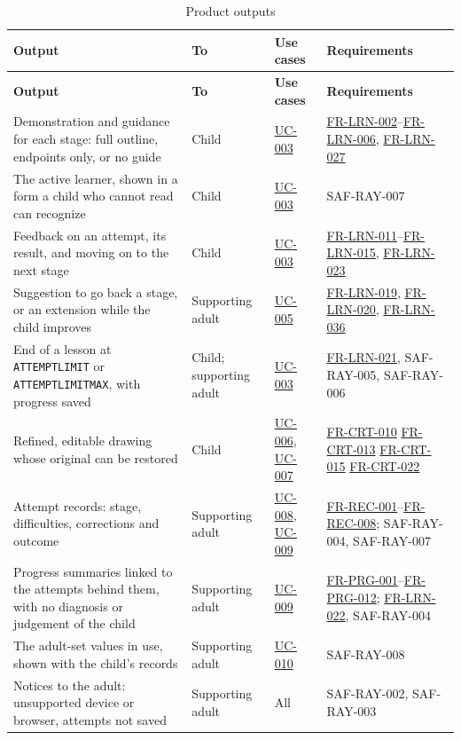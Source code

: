 \documentclass[12pt]{article}
\renewcommand{\_}{\textunderscore\allowbreak}%
\newcommand{\ucref}[1]{\hyperref[uc:#1]{\mbox{UC-#1}}}
\newcommand{\reqref}[1]{\hyperref[req:#1]{#1}}
\providecommand{\ucref}[1]{\hyperref[uc:#1]{UC-#1}}
\begin{document}
{\footnotesize
\setlength{\tabcolsep}{4pt}
\begin{longtable}{@{}
  >{\raggedright\arraybackslash}p{}
  >{\raggedright\arraybackslash}p{}
  >{\raggedright\arraybackslash}p{}
  >{\raggedright\arraybackslash}p{}@{}} \caption{Product
  outputs}\label{tab:product-outputs}\\
\toprule
\textbf{Output} & \textbf{To} & \textbf{Use cases} & \textbf{Requirements} \\
\midrule
\endfirsthead
\toprule
\textbf{Output} & \textbf{To} & \textbf{Use cases} & \textbf{Requirements} \\
\midrule
\endhead
\bottomrule
\endlastfoot
Demonstration and guidance for each stage: full outline, endpoints only, or no
guide & Child & \ucref{003} &
\mbox{\reqref{FR-LRN-002}}--\mbox{\reqref{FR-LRN-006}}, \mbox{\reqref{FR-LRN-027}} \\
\addlinespace
The active learner, shown in a form a child who cannot read can recognize &
Child & \ucref{003} & SAF-RAY-007 \\
\addlinespace
Feedback on an attempt, its result, and moving on to the next stage & Child &
\ucref{003} & \mbox{\reqref{FR-LRN-011}}--\mbox{\reqref{FR-LRN-015}},
\mbox{\reqref{FR-LRN-023}} \\
\addlinespace
Suggestion to go back a stage, or an extension while the child improves &
Supporting adult & \ucref{005} & \mbox{\reqref{FR-LRN-019}}, \mbox{\reqref{FR-LRN-020}},
\mbox{\reqref{FR-LRN-036}} \\
\addlinespace
End of a lesson at \texttt{ATTEMPT\_LIMIT} or \texttt{ATTEMPT\_LIMIT\_MAX}, with
progress saved & Child; supporting adult & \ucref{003} &
\mbox{\reqref{FR-LRN-021}}, SAF-RAY-005, SAF-RAY-006 \\
\addlinespace
Refined, editable drawing whose original can be restored & Child & \ucref{006},
\ucref{007} & \reqref{FR-CRT-010} \reqref{FR-CRT-013} \reqref{FR-CRT-015}
\reqref{FR-CRT-022} \\
\addlinespace
Attempt records: stage, difficulties, corrections and outcome & Supporting adult
& \ucref{008}, \ucref{009} & \reqref{FR-REC-001}--\reqref{FR-REC-008};
SAF-RAY-004, SAF-RAY-007 \\
\addlinespace
Progress summaries linked to the attempts behind them, with no diagnosis or
judgement of the child & Supporting adult & \ucref{009} &
\reqref{FR-PRG-001}--\reqref{FR-PRG-012}; \mbox{\reqref{FR-LRN-022}},
SAF-RAY-004 \\
\addlinespace
The adult-set values in use, shown with the child's records & Supporting adult &
\ucref{010} & SAF-RAY-008 \\
\addlinespace
Notices to the adult: unsupported device or browser, attempts not saved &
Supporting adult & All & SAF-RAY-002, SAF-RAY-003 \\
\end{longtable}
}
\end{document}
